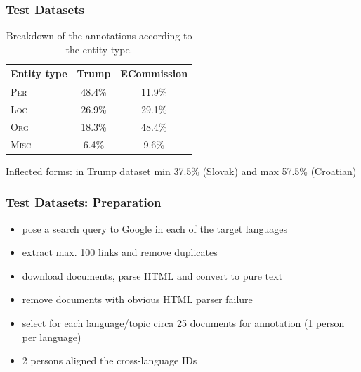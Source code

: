 \documentclass{beamer}
\begin{document}
\begin{frame}[fragile]
 \frametitle{Test Datasets}

\begin{table}
  \begin{center}
    \begin{footnotesize}
      \begin{tabular}{lcc}
        \toprule 
        Entity type & {\textbf{{\sc Trump}}} & {\textbf{{\sc ECommission}}} \\
        \midrule
	\textsc{Per} & 48.4\% & 11.9\% \\
	\textsc{Loc} & 26.9\% & 29.1\% \\
	\textsc{Org} & 18.3\% & 48.4\% \\
	\textsc{Misc} & \phantom{0}6.4\% & \phantom{0}9.6\% \\
        \bottomrule
      \end{tabular}
    \end{footnotesize}
  \end{center}
  \caption{Breakdown of the annotations according to the entity type.}
\end{table}

Inflected forms: in {\sc Trump} dataset min {\color{red}37.5\%} (Slovak) and max {\color{red}57.5\%} (Croatian)

\end{frame}

\begin{frame}[fragile]
 \frametitle{Test Datasets: Preparation}

\begin{itemize}

\item pose a search query to Google in each of the target languages

\vspace{0.2cm}

\item extract max. 100 links and remove duplicates

\vspace{0.2cm}

\item download documents, parse HTML and convert to pure text

\vspace{0.2cm}

\item remove documents with obvious HTML parser failure

\vspace{0.2cm}

\item select for each language/topic circa 25 documents for annotation (1 person per language)

\vspace{0.2cm}

\item 2 persons aligned the cross-language IDs

\end{itemize}

\end{frame}
\end{document}
